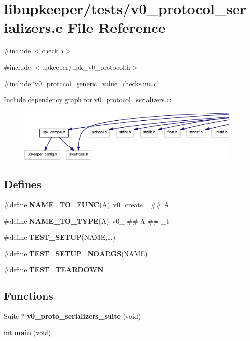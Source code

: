 \section{libupkeeper/tests/v0\_\-protocol\_\-serializers.c File Reference}
\label{v0__protocol__serializers_8c}
{\ttfamily \#include $<$check.h$>$}\par
{\ttfamily \#include $<$upkeeper/upk\_\-v0\_\-protocol.h$>$}\par
{\ttfamily \#include \char`\"{}v0\_\-protocol\_\-generic\_\-value\_\-checks.inc.c\char`\"{}}\par
Include dependency graph for v0\_\-protocol\_\-serializers.c:\nopagebreak
\begin{figure}[H]
\begin{center}
\leavevmode
\includegraphics[width=400pt]{v0__protocol__serializers_8c__incl}
\end{center}
\end{figure}
\subsection*{Defines}
\begin{DoxyCompactItemize}
\item 
\#define {\bf NAME\_\-TO\_\-FUNC}(A)~v0\_\-create\_\- \#\# A
\item 
\#define {\bf NAME\_\-TO\_\-TYPE}(A)~v0\_\- \#\# A \#\# \_\-t
\item 
\#define {\bf TEST\_\-SETUP}(NAME,...)
\item 
\#define {\bf TEST\_\-SETUP\_\-NOARGS}(NAME)
\item 
\#define {\bf TEST\_\-TEARDOWN}
\end{DoxyCompactItemize}
\subsection*{Functions}
\begin{DoxyCompactItemize}
\item 
Suite $\ast$ {\bf v0\_\-proto\_\-serializers\_\-suite} (void)
\item 
int {\bf main} (void)
\end{DoxyCompactItemize}


